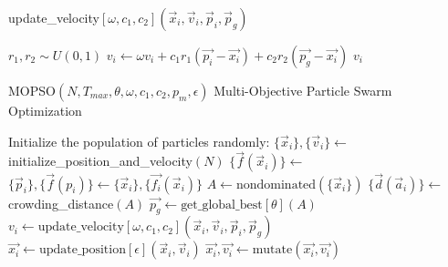 \begin{algorithm}[H]
\caption{update\_velocity$[\omega,c_1, c_2](\vec{x}_i,\vec{v}_i,\vec{p}_i,\vec{p}_g)$}
\label{alg:update_vel}
\begin{algorithmic}[1]
\State $r_1, r_2 \sim U(0,1)$
\State $v_i \gets \omega v_i + c_1 r_1 (\vec{p_i} - \vec{x_i}) + c_2 r_2 (\vec{p_g} - \vec{x_i})$
\State \Return $v_i$
\end{algorithmic}
\end{algorithm}
 
\begin{algorithm}[H]
\caption{ MOPSO$(N,T_{max},\theta,\omega,c_1,c_2,p_m,\epsilon)$ Multi-Objective Particle Swarm Optimization}
\label{alg:mopso}
\begin{algorithmic}[1]
\State Initialize the population of particles randomly:
\State $\{\vec{x}_i\}, \{\vec{v}_i\} \gets$ initialize\_position\_and\_velocity$(N)$
\State $\{\vec{f}(\vec{x}_i)\} \gets$ 
\State $\{\vec{p}_i\}, \{\vec{f}(p_i)\}  \gets \{\vec{x}_i\}, \{\vec{f_{i}}(\vec{x}_i)\} $ 
\State $A \gets \text{nondominated}(\{\vec{x}_i\})$ 
\State $\{ \vec{d}(\vec{a}_i)\} \gets$ crowding\_distance$(A)$ 
\State $\vec{p_g} \gets \text{get\_global\_best}[\theta](A)$ 
\State $v_i \gets \text{update\_velocity}[\omega,c_1, c_2](\vec{x}_i,\vec{v}_i,\vec{p}_i,\vec{p}_g)$
\State $\vec{x_i} \gets \text{update\_position}[\epsilon](\vec{x}_i,\vec{v}_i)$
\State $\vec{x_i}, \vec{v_i} \gets \text{mutate}(\vec{x_i}, \vec{v_i})$ 
\EndIf

\end{algorithmic}
\end{algorithm}
